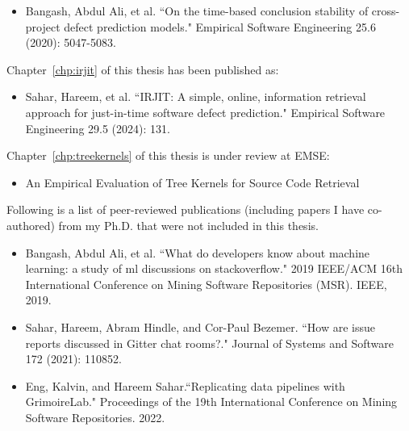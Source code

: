 \documentclass[\main/thesis.tex]{subfiles}
\begin{document}
\begin{itemize}
		\item{Bangash, Abdul Ali, et al. ``On the time-based conclusion stability of cross-project defect prediction models." Empirical Software Engineering 25.6 (2020): 5047-5083.}
		
\end{itemize}

Chapter~\ref{chp:irjit} of this thesis has been published as:

\begin{itemize}
	\item{Sahar, Hareem, et al. ``IRJIT: A simple, online, information retrieval approach for just-in-time software defect prediction." Empirical Software Engineering 29.5 (2024): 131.}
\end{itemize}

Chapter~\ref{chp:treekernels} of this thesis is under review at EMSE:
\begin{itemize}
	\item{An Empirical Evaluation of Tree Kernels for Source Code Retrieval}
\end{itemize}

Following is a list of peer-reviewed publications (including papers I have co-authored) from my Ph.D. that were not included in this thesis.

\begin{itemize}
\item{Bangash, Abdul Ali, et al. ``What do developers know about machine learning: a study of ml discussions on stackoverflow." 2019 IEEE/ACM 16th International Conference on Mining Software Repositories (MSR). IEEE, 2019.}

\item{Sahar, Hareem, Abram Hindle, and Cor-Paul Bezemer. ``How are issue reports discussed in Gitter chat rooms?." Journal of Systems and Software 172 (2021): 110852.}

\item{Eng, Kalvin, and Hareem Sahar.``Replicating data pipelines with GrimoireLab." Proceedings of the 19th International Conference on Mining Software Repositories. 2022.}
\end{itemize}
\end{document}
